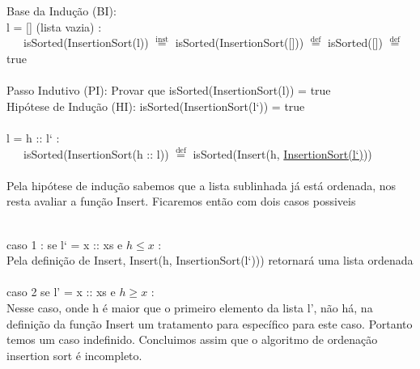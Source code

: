\documentclass[a4paper, 10pt]{article}
\begin{document}
Base da Indução (BI): \\
l = [] (lista vazia) :\\
\ \ \ isSorted(InsertionSort(l)) $\stackrel{\text{inst}}{=}$ isSorted(InsertionSort([])) $\stackrel{\text{def}}{=}$ isSorted([]) $\stackrel{\text{def}}{=}$ true \checkmark\\~\\

Passo Indutivo (PI): Provar que isSorted(InsertionSort(l)) = true\\
Hipótese de Indução (HI): isSorted(InsertionSort(l`)) = true\\~\\

l = h :: l` :\\
\ \ \ 
isSorted(InsertionSort(h :: l)) $\stackrel{\text{def}}{=}$ isSorted(Insert(h, \underline{InsertionSort(l`)}))\\~\\

Pela hipótese de indução sabemos que a lista sublinhada já está ordenada, nos resta avaliar a função Insert. Ficaremos então com dois casos possiveis\\~\\
\newpage

caso 1 : se l` = x :: xs e $h \leq x$ :\\
Pela definição de Insert, Insert(h, InsertionSort(l`))) retornará uma lista ordenada \checkmark\\~\\

caso 2 se l' = x :: xs e $h \geq x$ :\\
Nesse caso, onde h é maior que o primeiro elemento da lista l', não há, na definição da função Insert um tratamento para específico para este caso. Portanto temos um caso indefinido. Concluimos assim que o algoritmo de ordenação insertion sort é incompleto.
\end{document}
